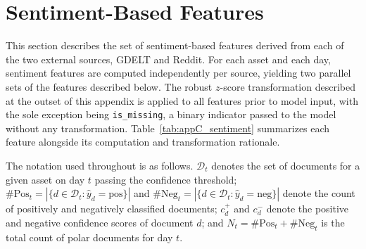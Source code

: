 \section{Sentiment-Based Features}
\label{sec:features_sentiment}

This section describes the set of sentiment-based features derived from each of the two external sources, GDELT and Reddit. For each asset and each day, sentiment features are computed independently per source, yielding two parallel sets of the features described below. The robust $z$-score transformation described at the outset of this appendix is applied to all features prior to model input, with the sole exception being \texttt{is\_missing}, a binary indicator passed to the model without any transformation. Table~\ref{tab:appC_sentiment} summarizes each feature alongside its computation and transformation rationale.

The notation used throughout is as follows. $\mathcal{D}_t$ denotes the set of documents for a given asset on day $t$ passing the confidence threshold; $\#\mathrm{Pos}_t = |\{d \in \mathcal{D}_t : \hat{y}_d = \mathrm{pos}\}|$ and $\#\mathrm{Neg}_t = |\{d \in \mathcal{D}_t : \hat{y}_d = \mathrm{neg}\}|$ denote the count of positively and negatively classified documents; $c_d^{+}$ and $c_d^{-}$ denote the positive and negative confidence scores of document $d$; and $N_t = \#\mathrm{Pos}_t + \#\mathrm{Neg}_t$ is the total count of polar documents for day $t$.

